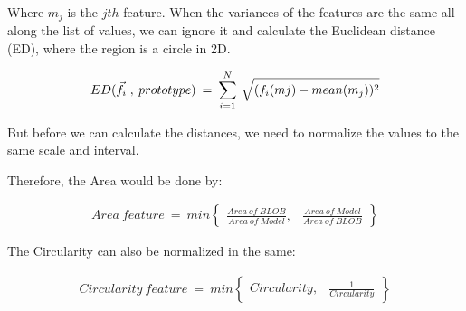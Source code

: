 Where {$m_{j}$} is the {$jth$} feature. When the variances of the features are the same all along the list of values, we can ignore it and calculate the Euclidean distance (ED), where the region is a circle in 2D.

\begin{equation}	
	\begin{aligned}
{ED(\vec{f}_{i} \; , \: prototype)} \: = \: \displaystyle\sum_{i=1}^N \: \sqrt{\mathstrut (f_{i}(m{j}) - mean(m_{j}))^2}
\label{Euclidean2}
	\end{aligned}
\end{equation}

But before we can calculate the distances, we need to normalize the values to the same scale and interval.

Therefore, the Area would be done by:

\begin{equation}	
	\begin{aligned}
{Area \: feature} \: = \: min \begin{Bmatrix} \displaystyle\frac{Area\:of\:BLOB}{Area\:of\:Model}, & \displaystyle\frac{Area\:of\:Model}{Area\:of\:BLOB}\end{Bmatrix}
\label{NormArea}
	\end{aligned}
\end{equation}

The Circularity can also be normalized in the same:

\begin{equation}	
	\begin{aligned}
{Circularity \: feature} \: = \: min \begin{Bmatrix} {Circularity}, & \displaystyle\frac{1}{Circularity}\end{Bmatrix}
\label{NormCirc}
	\end{aligned}
\end{equation}